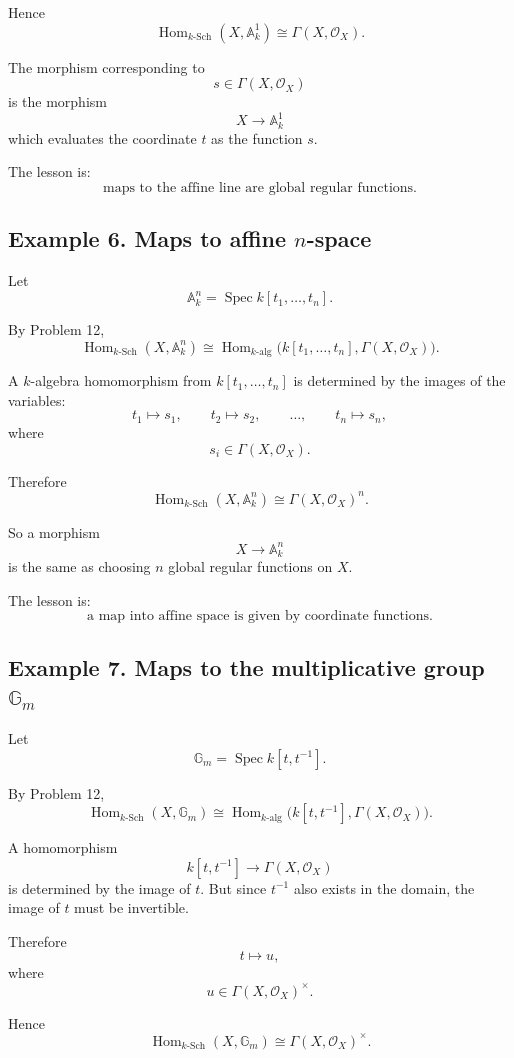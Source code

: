 \documentclass[12pt,a4paper]{article}
\DeclareMathOperator{\Hom}{Hom}
\newcommand{\Spec}{\operatorname{Spec}}
\newcommand{\Sch}{\mathrm{Sch}}
\theoremstyle{notespace}
\begin{document}
Hence
\[
\boxed{
	\Hom_{k\text{-}\Sch}(X,\mathbb A^1_k)
	\cong
	\Gamma(X,\mathcal O_X).
}
\]

The morphism corresponding to
\[
s\in\Gamma(X,\mathcal O_X)
\]
is the morphism
\[
X\to\mathbb A^1_k
\]
which evaluates the coordinate \(t\) as the function \(s\).

The lesson is:
\[
\boxed{
	\text{maps to the affine line are global regular functions.}
}
\]

\subsection{Example 6. Maps to affine \(n\)-space}

Let
\[
\mathbb A^n_k=\Spec k[t_1,\dots,t_n].
\]

By Problem 12,
\[
\Hom_{k\text{-}\Sch}(X,\mathbb A^n_k)
\cong
\Hom_{k\text{-}\mathrm{alg}}
\bigl(k[t_1,\dots,t_n],\Gamma(X,\mathcal O_X)\bigr).
\]

A \(k\)-algebra homomorphism from \(k[t_1,\dots,t_n]\) is determined by the images of the variables:
\[
t_1\mapsto s_1,
\qquad
t_2\mapsto s_2,
\qquad
\dots,
\qquad
t_n\mapsto s_n,
\]
where
\[
s_i\in\Gamma(X,\mathcal O_X).
\]

Therefore
\[
\boxed{
	\Hom_{k\text{-}\Sch}(X,\mathbb A^n_k)
	\cong
	\Gamma(X,\mathcal O_X)^n.
}
\]

So a morphism
\[
X\to\mathbb A^n_k
\]
is the same as choosing \(n\) global regular functions on \(X\).

The lesson is:
\[
\boxed{
	\text{a map into affine space is given by coordinate functions.}
}
\]

\subsection{Example 7. Maps to the multiplicative group \(\mathbb G_m\)}

Let
\[
\mathbb G_m=\Spec k[t,t^{-1}].
\]

By Problem 12,
\[
\Hom_{k\text{-}\Sch}(X,\mathbb G_m)
\cong
\Hom_{k\text{-}\mathrm{alg}}
\bigl(k[t,t^{-1}],\Gamma(X,\mathcal O_X)\bigr).
\]

A homomorphism
\[
k[t,t^{-1}]\to \Gamma(X,\mathcal O_X)
\]
is determined by the image of \(t\). But since \(t^{-1}\) also exists in the domain, the image of \(t\) must be invertible.

Therefore
\[
t\mapsto u,
\]
where
\[
u\in\Gamma(X,\mathcal O_X)^\times.
\]

Hence
\[
\boxed{
	\Hom_{k\text{-}\Sch}(X,\mathbb G_m)
	\cong
	\Gamma(X,\mathcal O_X)^\times.
}
\]
\end{document}
